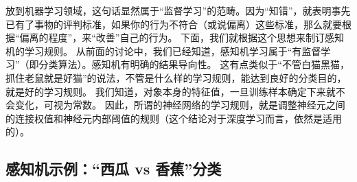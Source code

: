 %
放到机器学习领域，这句话显然属于“监督学习”的范畴。因为“知错”，就表明事先已有了事物的评判标准，如果你的行为不符合（或说偏离）这些标准，那么就要根据“偏离的程度”，来“改善”自己的行为。
下面，我们就根据这个思想来制订感知机的学习规则。
从前面的讨论中，我们已经知道，感知机学习属于“有监督学习”（即分类算法）。感知机有明确的结果导向性。
这有点类似于“不管白猫黑猫，抓住老鼠就是好猫”的说法，不管是什么样的学习规则，能达到良好的分类目的，就是好的学习规则。
我们知道，对象本身的特征值，一旦训练样本确定下来就不会变化，可视为常数。
因此，所谓的神经网络的学习规则，就是调整神经元之间的连接权值和神经元内部阈值的规则（这个结论对于深度学习而言，依然是适用的）。
\subsection{感知机示例：“西瓜 vs 香蕉”分类}



